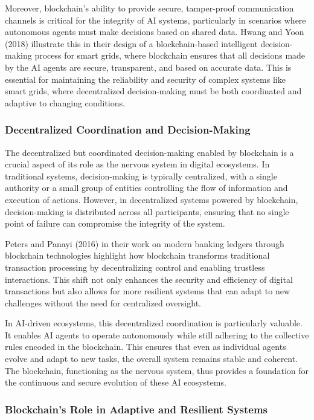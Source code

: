 \documentclass[12pt,twoside]{article}
\begin{document}
Moreover, blockchain’s ability to provide secure, tamper-proof communication channels is critical for the integrity of AI systems, particularly in scenarios where autonomous agents must make decisions based on shared data. Hwang and Yoon (2018) illustrate this in their design of a blockchain-based intelligent decision-making process for smart grids, where blockchain ensures that all decisions made by the AI agents are secure, transparent, and based on accurate data. This is essential for maintaining the reliability and security of complex systems like smart grids, where decentralized decision-making must be both coordinated and adaptive to changing conditions.

\subsubsection{Decentralized Coordination and Decision-Making}

The decentralized but coordinated decision-making enabled by blockchain is a crucial aspect of its role as the nervous system in digital ecosystems. In traditional systems, decision-making is typically centralized, with a single authority or a small group of entities controlling the flow of information and execution of actions. However, in decentralized systems powered by blockchain, decision-making is distributed across all participants, ensuring that no single point of failure can compromise the integrity of the system.

Peters and Panayi (2016) in their work on modern banking ledgers through blockchain technologies highlight how blockchain transforms traditional transaction processing by decentralizing control and enabling trustless interactions. This shift not only enhances the security and efficiency of digital transactions but also allows for more resilient systems that can adapt to new challenges without the need for centralized oversight.

In AI-driven ecosystems, this decentralized coordination is particularly valuable. It enables AI agents to operate autonomously while still adhering to the collective rules encoded in the blockchain. This ensures that even as individual agents evolve and adapt to new tasks, the overall system remains stable and coherent. The blockchain, functioning as the nervous system, thus provides a foundation for the continuous and secure evolution of these AI ecosystems.

\subsubsection{Blockchain's Role in Adaptive and Resilient Systems}
\end{document}
